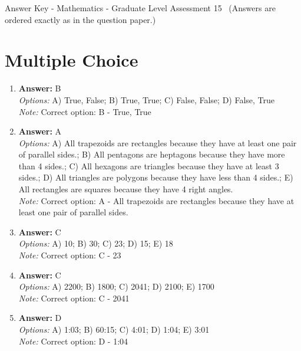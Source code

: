 \documentclass[12pt]{article}
\begin{document}
\begin{center}
Answer Key - Mathematics - Graduate Level Assessment 15 \
\small (Answers are ordered exactly as in the question paper.)
\end{center}

\section*{Multiple Choice}
\begin{enumerate}[label=\arabic*.]
\item \textbf{Answer:} B
\\ \textit{Options:} A) True, False; B) True, True; C) False, False; D) False, True
\\ \textit{Note:} Correct option: B - True, True
\item \textbf{Answer:} A
\\ \textit{Options:} A) All trapezoids are rectangles because they have at least one pair of parallel sides.; B) All pentagons are heptagons because they have more than 4 sides.; C) All hexagons are triangles because they have at least 3 sides.; D) All triangles are polygons because they have less than 4 sides.; E) All rectangles are squares because they have 4 right angles.
\\ \textit{Note:} Correct option: A - All trapezoids are rectangles because they have at least one pair of parallel sides.
\item \textbf{Answer:} C
\\ \textit{Options:} A) 10; B) 30; C) 23; D) 15; E) 18
\\ \textit{Note:} Correct option: C - 23
\item \textbf{Answer:} C
\\ \textit{Options:} A) 2200; B) 1800; C) 2041; D) 2100; E) 1700
\\ \textit{Note:} Correct option: C - 2041
\item \textbf{Answer:} D
\\ \textit{Options:} A) 1:03; B) 60:15; C) 4:01; D) 1:04; E) 3:01
\\ \textit{Note:} Correct option: D - 1:04
\end{enumerate}
\end{document}
